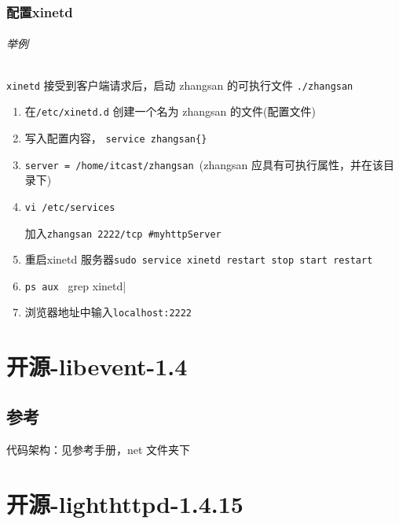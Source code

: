 \documentclass[UTF8,a4paper,8pt]{ctexbook}
\begin{document}
		\subsection{配置xinetd}
			\subparagraph{举例}\verb|xinetd| 接受到客户端请求后，启动 zhangsan 的可执行文件  \verb|./zhangsan|
				\begin{enumerate}[itemindent = 2em ]
					\item 在\verb|/etc/xinetd.d| 创建一个名为 zhangsan 的文件(配置文件)
					\item 写入配置内容， \verb|service zhangsan{}|
					\item \verb|server = /home/itcast/zhangsan |(zhangsan 应具有可执行属性，并在该目录下)
					\item \verb|vi /etc/services |
					
						加入\verb|zhangsan 2222/tcp #myhttpServer|
						
					\item 重启xinetd 服务器\verb|sudo service xinetd restart stop start restart|
					\item \verb|ps aux | grep xinetd|
					
					\item 浏览器地址中输入\verb|localhost:2222|
				\end{enumerate}
				
\chapter{开源-libevent-1.4}
	\section{参考}
		代码架构：见参考手册，net 文件夹下
	
\chapter{开源-lighthttpd-1.4.15}
\end{document}
